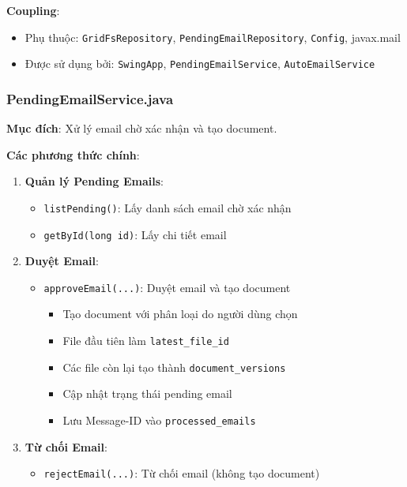 \documentclass[12pt,a4paper]{article}
\begin{document}
\textbf{Coupling}:
\begin{itemize}
    \item Phụ thuộc: \texttt{GridFsRepository}, \texttt{PendingEmailRepository}, \texttt{Config}, javax.mail
    \item Được sử dụng bởi: \texttt{SwingApp}, \texttt{PendingEmailService}, \texttt{AutoEmailService}
\end{itemize}

\subsubsection{PendingEmailService.java}
\textbf{Mục đích}: Xử lý email chờ xác nhận và tạo document.

\textbf{Các phương thức chính}:

\begin{enumerate}
    \item \textbf{Quản lý Pending Emails}:
    \begin{itemize}
        \item \texttt{listPending()}: Lấy danh sách email chờ xác nhận
        \item \texttt{getById(long id)}: Lấy chi tiết email
    \end{itemize}
    
    \item \textbf{Duyệt Email}:
    \begin{itemize}
        \item \texttt{approveEmail(...)}: Duyệt email và tạo document
        \begin{itemize}
            \item Tạo document với phân loại do người dùng chọn
            \item File đầu tiên làm \texttt{latest\_file\_id}
            \item Các file còn lại tạo thành \texttt{document\_versions}
            \item Cập nhật trạng thái pending email
            \item Lưu Message-ID vào \texttt{processed\_emails}
        \end{itemize}
    \end{itemize}
    
    \item \textbf{Từ chối Email}:
    \begin{itemize}
        \item \texttt{rejectEmail(...)}: Từ chối email (không tạo document)
    \end{itemize}
    

\end{enumerate}
\end{document}
